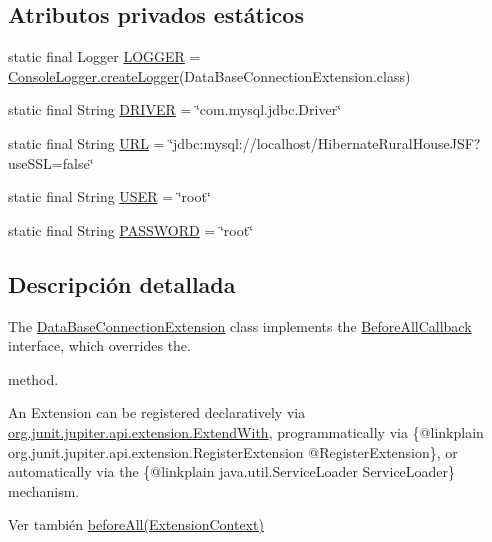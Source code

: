 \subsection*{Atributos privados estáticos}
\begin{DoxyCompactItemize}
\item 
static final Logger \mbox{\hyperlink{a00264_a936421171342cb936e683bceb8e819e8}{L\+O\+G\+G\+ER}} = \mbox{\hyperlink{a00220_a520321643663e37d95761134a35505cd}{Console\+Logger.\+create\+Logger}}(Data\+Base\+Connection\+Extension.\+class)
\item 
static final String \mbox{\hyperlink{a00264_adbba54504b8c15c35363b8c6ee62772f}{D\+R\+I\+V\+ER}} = \char`\"{}com.\+mysql.\+jdbc.\+Driver\char`\"{}
\item 
static final String \mbox{\hyperlink{a00264_aec89224948925eb2f40d169ba4dc00a9}{U\+RL}} = \char`\"{}jdbc\+:mysql\+://localhost/Hibernate\+Rural\+House\+J\+SF?use\+S\+SL=false\char`\"{}
\item 
static final String \mbox{\hyperlink{a00264_a87696d6ea7d62869301b08d9264182b0}{U\+S\+ER}} = \char`\"{}root\char`\"{}
\item 
static final String \mbox{\hyperlink{a00264_a8b37073a138c653895098f4a0c0f661f}{P\+A\+S\+S\+W\+O\+RD}} = \char`\"{}root\char`\"{}
\end{DoxyCompactItemize}


\subsection{Descripción detallada}
The \mbox{\hyperlink{a00264}{Data\+Base\+Connection\+Extension}} class implements the \mbox{\hyperlink{}{Before\+All\+Callback}} interface, which overrides the. 


\begin{DoxyCode}{0}
\end{DoxyCode}


method. 

An Extension can be registered {\ttfamily declaratively} via \mbox{\hyperlink{}{org.\+junit.\+jupiter.\+api.\+extension.\+Extend\+With}}, {\ttfamily programmatically} via \{@linkplain org.\+junit.\+jupiter.\+api.\+extension.\+Register\+Extension @\+Register\+Extension\}, or {\ttfamily automatically} via the \{@linkplain java.\+util.\+Service\+Loader Service\+Loader\} mechanism.

\begin{DoxySeeAlso}{Ver también}
\mbox{\hyperlink{a00264_ae1fe703d5f0bdd5f29f0f4b9f0645e3e}{before\+All(\+Extension\+Context)}} 
\end{DoxySeeAlso}


